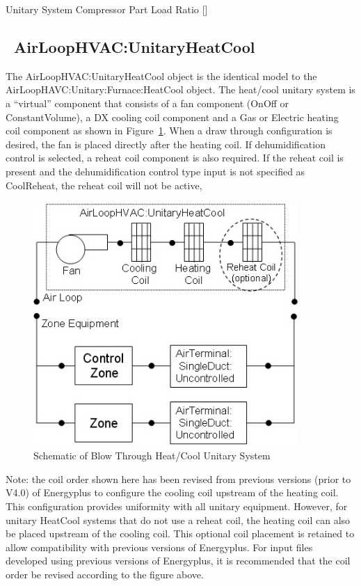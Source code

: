 Unitary System Compressor Part Load Ratio {[]}

\subsection{~AirLoopHVAC:UnitaryHeatCool}\label{airloophvacunitaryheatcool}

The AirLoopHVAC:UnitaryHeatCool object is the identical model to the AirLoopHAVC:Unitary:Furnace:HeatCool object. The heat/cool unitary system is a ``virtual'' component that consists of a fan component (OnOff or ConstantVolume), a DX cooling coil component and a Gas or Electric heating coil component as shown in Figure~\ref{fig:schematic-of-blow-through-heatcool-unitary}. When a draw through configuration is desired, the fan is placed directly after the heating coil. If dehumidification control is selected, a reheat coil component is also required. If the reheat coil is present and the dehumidification control type input is not specified as CoolReheat, the reheat coil will not be active,

\begin{figure}[hbtp] %
\centering
\includegraphics[width=0.9\textwidth, height=0.9\textheight, keepaspectratio=true]{media/image299.png}
\caption{Schematic of Blow Through Heat/Cool Unitary System \protect \label{fig:schematic-of-blow-through-heatcool-unitary}}
\end{figure}

Note: the coil order shown here has been revised from previous versions (prior to V4.0) of Energyplus to configure the cooling coil upstream of the heating coil. This configuration provides uniformity with all unitary equipment. However, for unitary HeatCool systems that do not use a reheat coil, the heating coil can also be placed upstream of the cooling coil. This optional coil placement is retained to allow compatibility with previous versions of Energyplus. For input files developed using previous versions of Energyplus, it is recommended that the coil order be revised according to the figure above.

